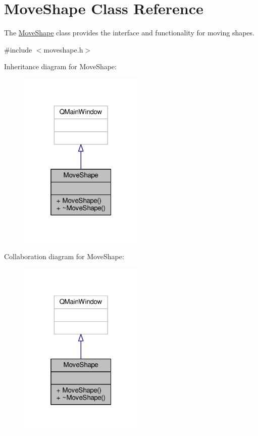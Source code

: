 \hypertarget{classMoveShape}{}\section{Move\+Shape Class Reference}
\label{classMoveShape}


The \hyperlink{classMoveShape}{Move\+Shape} class provides the interface and functionality for moving shapes.  




{\ttfamily \#include $<$moveshape.\+h$>$}



Inheritance diagram for Move\+Shape\+:\nopagebreak
\begin{figure}[H]
\begin{center}
\leavevmode
\includegraphics[width=169pt]{classMoveShape__inherit__graph}
\end{center}
\end{figure}


Collaboration diagram for Move\+Shape\+:\nopagebreak
\begin{figure}[H]
\begin{center}
\leavevmode
\includegraphics[width=169pt]{classMoveShape__coll__graph}
\end{center}
\end{figure}
